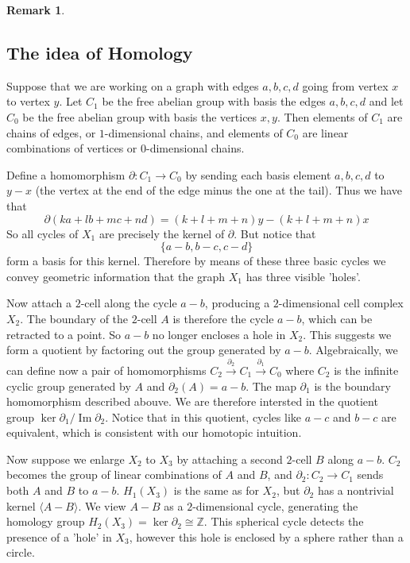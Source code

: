 \documentclass[11pt,a4paper]{article}
\theoremstyle{definition}
\newtheorem{remark}[definition]{Remark}
\theoremstyle{plain}
\theoremstyle{remark}
\begin{document}
\begin{remark}
\subsection{The idea of Homology} 
Suppose that we are working on a graph with edges $a,b,c,d$ going from vertex $x$ to vertex $y$. 
Let $C_1$ be the free abelian group with basis the edges $a,b,c,d$ and let $C_0$ be the free abelian group with 
basis the vertices $x,y$.
Then elements of $C_1$ are chains of edges, or $1$-dimensional chains, and elements of $C_0$ are linear combinations of 
vertices or $0$-dimensional chains. 

Define a homomorphism $\partial \colon C_1 \to C_0$ by sending each basis element $a,b,c,d$ to $y-x$ (the vertex at the end of the edge minus the one at the tail).
Thus we have that 
$$\partial (ka + lb + mc + nd) = (k + l + m + n)y - (k + l + m +n) x$$ 
So all cycles of $X_1$ are precisely the kernel of $\partial$. But notice that 
$$\{a-b, b-c, c-d\}$$
form a basis for this kernel. Therefore by means of these three basic cycles we convey 
geometric information that the graph $X_1$ has three visible 'holes'. 

Now attach a $2$-cell along the cycle $a - b$, producing a $2$-dimensional cell complex $X_2$. The boundary 
of the $2$-cell $A$ is therefore the cycle $a-b$, which can be retracted to a point. So $a-b$ no longer encloses a hole in $X_2$.
This suggests we form a quotient by factoring out the group generated by $a-b$. 
Algebraically, we can define now a pair of homomorphisms $C_2 \xrightarrow{\partial_2} C_1 \xrightarrow{\partial_1} C_0$ 
where $C_2$ is the infinite cyclic group generated by $A$ and $\partial_2(A) = a-b$. The map $\partial_1$ 
is the boundary homomorphism described abouve. We are therefore intersted in the quotient group $\ker \partial_1 / \operatorname{Im} \partial_2$.
Notice that in this quotient, cycles like $a-c$ and $b-c$ are equivalent, which is consistent with our homotopic intuition. 

Now suppose we enlarge $X_2$ to $X_3$ by attaching a second $2$-cell $B$ along $a-b$. $C_2$ becomes the group of linear combinations 
of $A$ and $B$, and $\partial_2 \colon C_2 \to C_1$ sends both $A$ and $B$ to $a-b$. 
$H_1(X_3)$ is the same as for $X_2$, but $\partial_2$ has a nontrivial kernel $\langle A-B \rangle$. 
We view $A-B$ as a $2$-dimensional cycle, generating the homology group $H_2(X_3) = \ker \partial_2 \cong \mathbb{Z}$. 
This spherical cycle detects the presence of a 'hole' in $X_3$, however this hole is enclosed by a sphere rather than a circle.


\end{remark}
\end{document}
